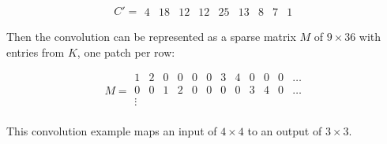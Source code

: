 $$
C' =
\begin{matrix}
  4 & 18 & 12 & 12 & 25 & 13 & 8 & 7 & 1
\end{matrix}
$$

Then the convolution can be represented as a sparse matrix $M$ of $9 \times 36$ with entries from $K$,
one patch per row:

$$
M =
\begin{matrix}
  1 & 2 & 0 & 0 & 0 & 0 & 3 & 4 & 0 & 0 & 0 & \dots \\
  0 & 0 & 1 & 2 & 0 & 0 & 0 & 0 & 3 & 4 & 0 & \dots \\
  \vdots \\
\end{matrix}
$$

This convolution example maps an input of $4 \times 4$ to an output of $3 \times 3$. 

\clearpage %
